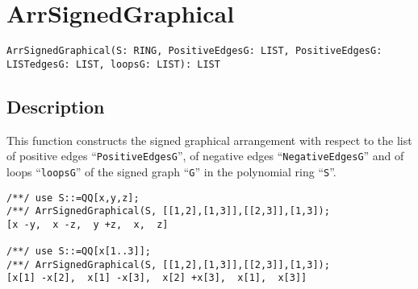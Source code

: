 \documentclass[a4paper]{mybook}
\newenvironment{command}{}{} %
\begin{document}
\section{ArrSignedGraphical}
\label{ArrSignedGraphical}
\begin{command} %


\begin{Verbatim}[label=syntax, rulecolor=\color{MidnightBlue},
frame=single]
ArrSignedGraphical(S: RING, PositiveEdgesG: LIST, PositiveEdgesG: LISTedgesG: LIST, loopsG: LIST): LIST 
\end{Verbatim}


\subsection*{Description}

This function constructs the signed graphical arrangement with respect
to the list of positive edges ``\verb&PositiveEdgesG&'', of negative edges
``\verb&NegativeEdgesG&'' and of loops ``\verb&loopsG&'' of the signed graph ``\verb&G&''
in the polynomial ring ``\verb&S&''.
\begin{Verbatim}[label=example, rulecolor=\color{PineGreen}, frame=single]
/**/ use S::=QQ[x,y,z];	
/**/ ArrSignedGraphical(S, [[1,2],[1,3]],[[2,3]],[1,3]);
[x -y,  x -z,  y +z,  x,  z]

/**/ use S::=QQ[x[1..3]];	
/**/ ArrSignedGraphical(S, [[1,2],[1,3]],[[2,3]],[1,3]);
[x[1] -x[2],  x[1] -x[3],  x[2] +x[3],  x[1],  x[3]]
\end{Verbatim}


\end{command} %
\end{document}
